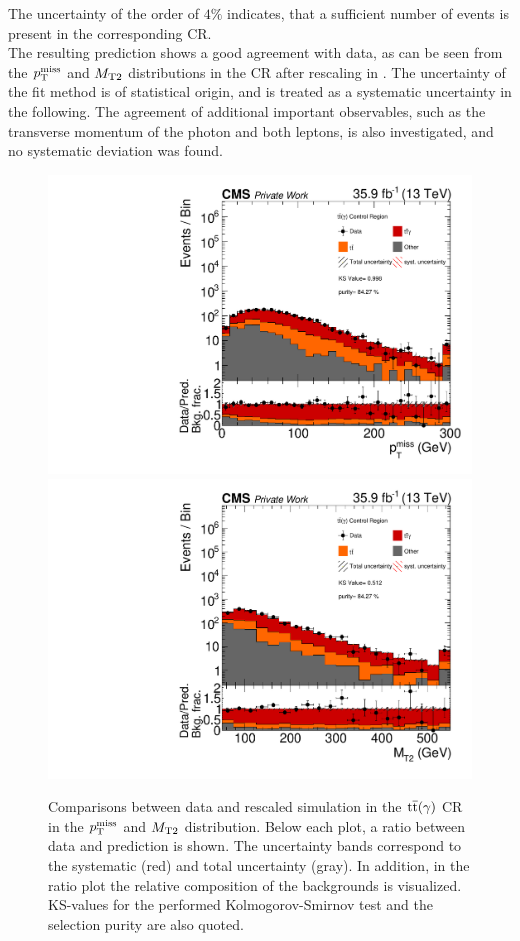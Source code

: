 The uncertainty of the order of $4\%$ indicates, that a sufficient number of events is present in the corresponding CR.\\
The resulting prediction shows a good agreement with data, as can be seen from the $p_{\mathrm{T}}^\text{miss}$ and $M_{\mathrm{T2}}$ distributions in the CR after rescaling in . The uncertainty of the fit method is of statistical origin, and is treated as a systematic uncertainty in the following. The agreement of additional important observables, such as the transverse momentum of the photon and both leptons, is also investigated, and no systematic deviation was found.
\begin{figure}[tbp]
 \centering
 \includegraphics[width=\pairwidth]{figures/plots_CR_tt/CRTT_EM_nom_met_log}
 \includegraphics[width=\pairwidth]{figures/plots_CR_tt/CRTT_EM_nom_mt2_log}
 \caption{Comparisons between data and rescaled simulation in the ${\mathrm{t}\overline{\mathrm{t}}}(\gamma)$ CR in the $p_{\mathrm{T}}^\text{miss}$ and $M_{\mathrm{T2}}$ distribution. Below each plot, a ratio between data and prediction is shown. The uncertainty bands correspond to the systematic (red) and total uncertainty (gray). In addition, in the ratio plot the relative composition of the backgrounds is visualized. KS-values for the performed Kolmogorov-Smirnov test and the selection purity are also quoted.}
 \label{fig:CRTT}
\end{figure}

